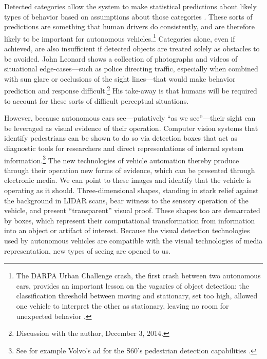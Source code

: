 Detected categories allow the system to make
statistical predictions about likely types of behavior based on
assumptions about those categories
\cite{predictPatent}. These sorts of predictions are 
something that human drivers do consistently, and are therefore
likely to be important for autonomous vehicles.\footnote{The
  DARPA Urban Challenge crash, the first crash between two autonomous
  cars, provides an important lesson on the vagaries of object
  detection: the classification threshold between moving and
  stationary, set too high, allowed one vehicle to interpret the other
  as stationary, leaving no room for unexpected behavior \cite{collisionPaper}.}
Categories alone, even if achieved, are also insufficient if detected
objects are treated solely as obstacles to be avoided. John Leonard
shows a collection of photographs and videos of situational
edge-cases---such as police  
directing traffic, especially when combined with sun glare or
occlusions of the sight lines---that
would make behavior prediction and response difficult.\footnote{Discussion with the author, December 3,
  2014.} His take-away is that humans will be
required to account for these sorts of difficult perceptual
situations. 



However, because autonomous cars see---putatively ``as we see''---their sight can
be leveraged as visual evidence of their operation. Computer vision
systems that identify 
pedestrians can be shown to do so via detection boxes that act as
diagnostic tools for researchers and direct representations of
internal system information.\footnote{See for example Volvo's ad for
  the S60's pedestrian detection capabilities \cite{volvovideo}.} The new technologies of vehicle
automation thereby produce through 
their operation new forms of evidence, which can be presented through
electronic media. We can point to these images and identify
that the vehicle is operating as it should. Three-dimensional shapes,
standing in stark relief against 
the background in LIDAR scans, bear witness to the sensory operation
of the vehicle, and present ``transparent'' visual proof.
These shapes too are demarcated by boxes, which represent their
computational transformation from information into an object or
artifact of interest. Because the visual detection technologies used
by autonomous vehicles are compatible with the visual technologies of
media representation, new types of seeing are opened to us.

